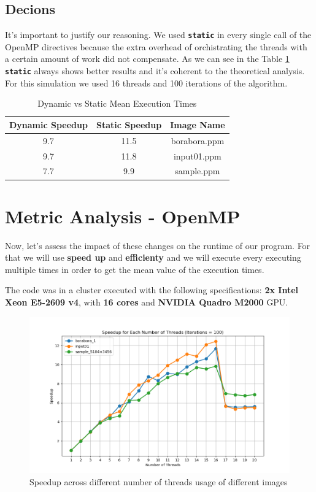 \documentclass[sigconf]{acmart}
\begin{document}
\subsection{Decions}
It's important to justify our reasoning. We used \texttt{\textbf{static}} in every single call of the OpenMP directives because the extra overhead of orchistrating the threads with a certain amount of work did not compensate. As we can see in the Table \ref{table:staticanddynamic} \texttt{\textbf{static}} always shows better results and it's coherent to the theoretical analysis. For this simulation we used 16 threads and 100 iterations of the algorithm.

\begin{table}[h!]
\centering
\begin{tabular}{|c|c|c|}
\hline
\textbf{Dynamic Speedup} & \textbf{Static Speedup} & \textbf{Image Name} \\
\hline
9.7 & 11.5& borabora.ppm \\
\hline
9.7 & 11.8 & input01.ppm \\
\hline
7.7 & 9.9 & sample.ppm \\
\hline
\end{tabular}
\vspace{0.2cm} %
\caption{Dynamic vs Static Mean Execution Times}
\label{table:staticanddynamic}
\end{table}

\section{Metric Analysis - OpenMP}
Now, let's assess the impact of these changes on the runtime of our program. For that we will use \textbf{speed up} and \textbf{efficienty} and we will execute every executing multiple times in order to get the mean value of the execution times.

The code was in a cluster executed with the following specifications: \textbf{2x Intel Xeon E5-2609 v4}, with \textbf{16 cores} and \textbf{NVIDIA Quadro M2000} GPU.

\begin{figure}[h]
  \centering
  \includegraphics[width=\linewidth]{images/openMP.png}
  \caption{Speedup across different number of threads usage of different images}
 \label{fig1}
\end{figure}
\end{document}
